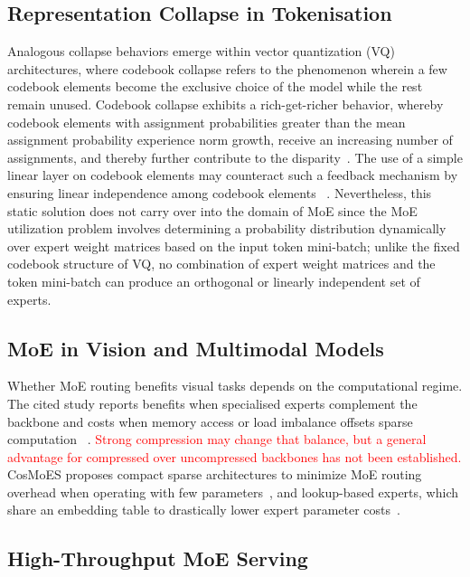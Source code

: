 \documentclass[10pt]{article}
\begin{document}
\subsection{Representation Collapse in Tokenisation}
Analogous collapse behaviors emerge within vector quantization (VQ) architectures, where codebook collapse refers
to the phenomenon wherein a few codebook elements become the exclusive choice of
the model while the rest remain unused. Codebook collapse exhibits a rich-get-richer
behavior, whereby codebook elements with assignment probabilities greater than the
mean assignment probability experience norm growth, receive an increasing number of
assignments, and thereby further contribute to the disparity~\citep{zhao2024representationcollapsingproblemsvector}.
The use of a simple linear layer on codebook elements may counteract such a
feedback mechanism by ensuring linear independence among codebook elements
~\citep{zhu2025addressingrepresentationcollapsevector}.  Nevertheless, this static solution does not
carry over into the domain of MoE since the MoE utilization problem involves
determining a probability distribution dynamically over expert weight matrices based
on the input token mini-batch; unlike the fixed codebook structure of VQ, no
combination of expert weight matrices and the token mini-batch can produce an
orthogonal or linearly independent set of experts.

\subsection{MoE in Vision and Multimodal Models}

Whether MoE routing benefits visual tasks depends on the computational regime.  The
cited study reports benefits when specialised experts complement the backbone and costs
when memory access or load imbalance offsets sparse computation
~\citep{sun2026doessparsemoehelp}.  \textcolor{red}{Strong compression may change that
balance, but a general advantage for compressed over uncompressed backbones has not
been established.}
CosMoES proposes compact sparse architectures to minimize MoE routing overhead when operating with few parameters~\citep{huber2025cosmoescompactsparsemixture},
and lookup-based experts, which share an embedding table to drastically lower expert parameter costs~\citep{jie2025mixturelookupexperts}.

\subsection{High-Throughput MoE Serving}
\label{sec:serving}
\end{document}

